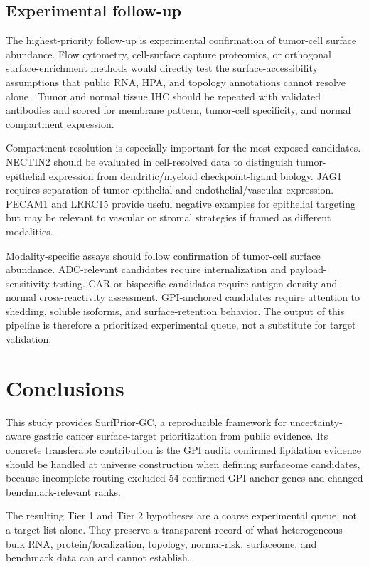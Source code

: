 \documentclass[review,12pt,authoryear]{elsarticle}
\begin{document}
\subsection{Experimental follow-up}

The highest-priority follow-up is experimental confirmation of tumor-cell surface abundance. Flow cytometry, cell-surface capture proteomics, or orthogonal surface-enrichment methods would directly test the surface-accessibility assumptions that public RNA, HPA, and topology annotations cannot resolve alone \citep{bauschfluck2015cspa,uhlen2015hpa,thul2017subcellular}. Tumor and normal tissue IHC should be repeated with validated antibodies and scored for membrane pattern, tumor-cell specificity, and normal compartment expression.

Compartment resolution is especially important for the most exposed candidates. NECTIN2 should be evaluated in cell-resolved data to distinguish tumor-epithelial expression from dendritic/\allowbreak{}myeloid checkpoint-ligand biology. JAG1 requires separation of tumor epithelial and endothelial/\allowbreak{}vascular expression. PECAM1 and LRRC15 provide useful negative examples for epithelial targeting but may be relevant to vascular or stromal strategies if framed as different modalities.

Modality-specific assays should follow confirmation of tumor-cell surface abundance. ADC-relevant candidates require internalization and payload-sensitivity testing. CAR or bispecific candidates require antigen-density and normal cross-reactivity assessment. GPI-anchored candidates require attention to shedding, soluble isoforms, and surface-retention behavior. The output of this pipeline is therefore a prioritized experimental queue, not a substitute for target validation.

\FloatBarrier
\section{Conclusions}

This study provides SurfPrior-GC, a reproducible framework for uncertainty-aware gastric cancer surface-target prioritization from public evidence. Its concrete transferable contribution is the GPI audit: confirmed lipidation evidence should be handled at universe construction when defining surfaceome candidates, because incomplete routing excluded 54 confirmed GPI-anchor genes and changed benchmark-relevant ranks.

The resulting Tier 1 and Tier 2 hypotheses are a coarse experimental queue, not a target list alone. They preserve a transparent record of what heterogeneous bulk RNA, protein/\allowbreak{}localization, topology, normal-risk, surfaceome, and benchmark data can and cannot establish.
\end{document}
